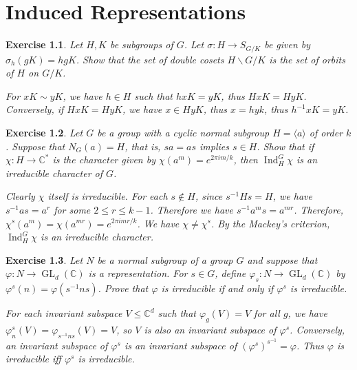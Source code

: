 \documentclass[11pt]{report}
\theoremstyle{mythm}
\let\oldendproof\endproof
\renewenvironment{proof}[1][\proofname]{%
  \oldproof[\normalfont \bfseries #1]%
}{\oldendproof}
\newtheorem{exercise}{Exercise}[chapter]
\renewcommand*{\proofname}{Proof}
\theoremstyle{myans}
\newcommand{\bbC}{\mathbb C}
\DeclareMathOperator{\GL}{GL}
\DeclareMathOperator{\Ind}{Ind}
\newcommand{\ang}[1]{\langle #1 \rangle}
\begin{document}
\setcounter{chapter}{7}
\chapter{Induced Representations}

\setcounter{exercise}{1}
\begin{exercise}
  Let $H, K$ be subgroups of $G$. Let $\sigma\colon H \to S_{G/K}$ be given by
  $\sigma_h(gK) = hgK$. Show that the set of double cosets $H\backslash G/K$ is the set of orbits of
  $H$ on $G/K$.
  \begin{proof}
    For $xK \sim yK$, we have $h\in H$ such that $hxK = yK$, thus $HxK = HyK$. Conversely, if
    $HxK = HyK$, we have $x \in HyK$, thus $x = h y k$, thus $h^{-1}xK = yK$.
  \end{proof}
\end{exercise}

\begin{exercise}
  Let $G$ be a group with a cyclic normal subgroup $H = \ang{a}$ of order
  $k$. Suppose that $N_G(a) = H$, that is, $sa = as$ implies $s \in H$. Show that if
  $\chi\colon H \to \bbC^*$ is the character given by $\chi(a^m) = e^{2\pi im/k}$, then $\Ind^G_H \chi$ is an
  irreducible character of $G$.
  \begin{proof}
    Clearly $\chi$ itself is irreducible. For each $s\notin H$, since $s^{-1}Hs = H$, we have
    $s^{-1}as = a^r$ for some $2\leq r \leq k-1$. Therefore we have $s^{-1} a^m s = a^{mr}$.
    Therefore, $\chi^s(a^m) = \chi(a^{mr}) = e^{2\pi i mr / k}$. We have $\chi \neq \chi^s$.
    By the Mackey's criterion, $\Ind_H^G \chi$ is an irreducible character.
  \end{proof}
\end{exercise}

\setcounter{exercise}{5}
\begin{exercise}
  Let $N$ be a normal subgroup of a group $G$ and suppose that $\varphi\colon N \to \GL_d(\bbC)$ is
  a representation. For $s \in G$, define $\varphi_s \colon N \to \GL_d(\bbC)$ by
  $\varphi^s(n) = \varphi(s^{-1}ns)$. Prove that $\varphi$ is irreducible if and only if $\varphi^s$
  is irreducible.
  \begin{proof}
    For each invariant subspace $V\leq \bbC^d$ such that $\varphi_g(V) = V$ for all $g$,
    we have $\varphi^s_n(V) = \varphi_{s^{-1}ns}(V) = V$, so $V$ is also an invariant subspace
    of $\varphi^s$. Conversely, an invariant subspace of $\varphi^s$ is an invariant subspace
    of $(\varphi^s)^{s^{-1}} = \varphi$. Thus $\varphi$ is irreducible iff $\varphi^s$ is irreducible.
  \end{proof}
\end{exercise}
\end{document}
